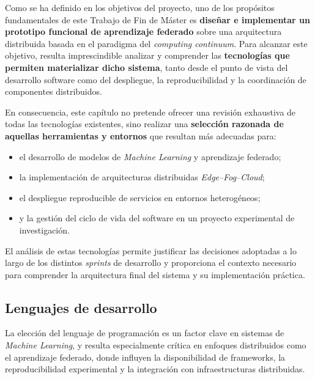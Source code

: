 \documentclass{report}
\begin{document}
Como se ha definido en los objetivos del proyecto, uno de los propósitos fundamentales de este Trabajo de Fin de Máster es \textbf{diseñar e implementar un prototipo funcional de aprendizaje federado} sobre una arquitectura distribuida basada en el paradigma del \textit{computing continuum}. Para alcanzar este objetivo, resulta imprescindible analizar y comprender las \textbf{tecnologías que permiten materializar dicho sistema}, tanto desde el punto de vista del desarrollo software como del despliegue, la reproducibilidad y la coordinación de componentes distribuidos.

En consecuencia, este capítulo no pretende ofrecer una revisión exhaustiva de todas las tecnologías existentes, sino realizar una \textbf{selección razonada de aquellas herramientas y entornos} que resultan más adecuadas para:
\begin{itemize}
    \item el desarrollo de modelos de \textit{Machine Learning} y aprendizaje federado;
    \item la implementación de arquitecturas distribuidas \textit{Edge--Fog--Cloud};
    \item el despliegue reproducible de servicios en entornos heterogéneos;
    \item y la gestión del ciclo de vida del software en un proyecto experimental de investigación.
\end{itemize}

El análisis de estas tecnologías permite justificar las decisiones adoptadas a lo largo de los distintos \textit{sprints} de desarrollo y proporciona el contexto necesario para comprender la arquitectura final del sistema y su implementación práctica.

\subsection{Lenguajes de desarrollo}
\label{sec:lenguajesdes}

La elección del lenguaje de programación es un factor clave en sistemas de \textit{Machine Learning}, y resulta especialmente crítica en enfoques distribuidos como el aprendizaje federado, donde influyen la disponibilidad de frameworks, la reproducibilidad experimental y la integración con infraestructuras distribuidas.
\end{document}
